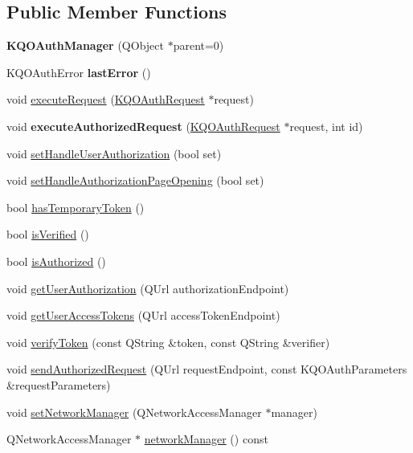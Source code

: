 \subsection*{Public Member Functions}
\begin{DoxyCompactItemize}
\item 
\mbox{\label{class_k_q_o_auth_manager_a947992e36987a0d1a5c1f958f575b067}} 
{\bfseries K\+Q\+O\+Auth\+Manager} (Q\+Object $\ast$parent=0)
\item 
\mbox{\label{class_k_q_o_auth_manager_acbef5c40d8ef15099270323b25c86ec6}} 
K\+Q\+O\+Auth\+Error {\bfseries last\+Error} ()
\item 
void \hyperlink{class_k_q_o_auth_manager_a7ed4ddfccc440383f72215cff7cb37ef}{execute\+Request} (\hyperlink{class_k_q_o_auth_request}{K\+Q\+O\+Auth\+Request} $\ast$request)
\item 
\mbox{\label{class_k_q_o_auth_manager_aa6e5a3664329ba0e52d8447f0cd911f0}} 
void {\bfseries execute\+Authorized\+Request} (\hyperlink{class_k_q_o_auth_request}{K\+Q\+O\+Auth\+Request} $\ast$request, int id)
\item 
void \hyperlink{class_k_q_o_auth_manager_a55409df469317596b81ab50823eb6a97}{set\+Handle\+User\+Authorization} (bool set)
\item 
void \hyperlink{class_k_q_o_auth_manager_a6da0168889f374d2b2d8e3a2ac0efe7d}{set\+Handle\+Authorization\+Page\+Opening} (bool set)
\item 
bool \hyperlink{class_k_q_o_auth_manager_a559976e71f9e27e0a34ce8aeacd8387a}{has\+Temporary\+Token} ()
\item 
bool \hyperlink{class_k_q_o_auth_manager_a2286fa49c7d21a46361cdac897efb726}{is\+Verified} ()
\item 
bool \hyperlink{class_k_q_o_auth_manager_ad16edf00de0367e95f0b04b9de97ba32}{is\+Authorized} ()
\item 
void \hyperlink{class_k_q_o_auth_manager_ab33a5aead44d35476d13152f4a35700b}{get\+User\+Authorization} (Q\+Url authorization\+Endpoint)
\item 
void \hyperlink{class_k_q_o_auth_manager_a657d5a05c680ed6c53199e9de59f2e1c}{get\+User\+Access\+Tokens} (Q\+Url access\+Token\+Endpoint)
\item 
void \hyperlink{class_k_q_o_auth_manager_a9bcf83ccbd9fbbc352b7a228d80713ef}{verify\+Token} (const Q\+String \&token, const Q\+String \&verifier)
\item 
void \hyperlink{class_k_q_o_auth_manager_ab605e437fb159d0a20e2e92601d679fe}{send\+Authorized\+Request} (Q\+Url request\+Endpoint, const K\+Q\+O\+Auth\+Parameters \&request\+Parameters)
\item 
void \hyperlink{class_k_q_o_auth_manager_a4cc730a5e030d461c889cd844b6b9e40}{set\+Network\+Manager} (Q\+Network\+Access\+Manager $\ast$manager)
\item 
Q\+Network\+Access\+Manager $\ast$ \hyperlink{class_k_q_o_auth_manager_a0e798ce8a270552a490369d6afd35e2d}{network\+Manager} () const
\end{DoxyCompactItemize}


